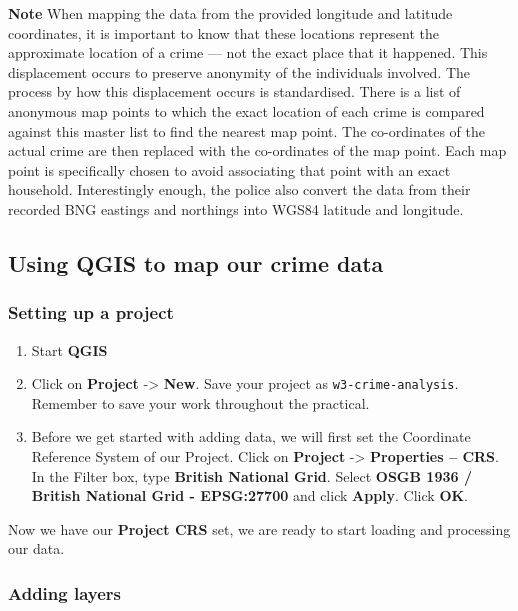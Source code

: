 \documentclass[
]{book}
\begin{document}
\textbf{Note}
When mapping the data from the provided longitude and latitude coordinates, it is important to know that these locations represent the approximate location of a crime --- not the exact place that it happened. This displacement occurs to preserve anonymity of the individuals involved. The process by how this displacement occurs is standardised. There is a list of anonymous map points to which the exact location of each crime is compared against this master list to find the nearest map point. The co-ordinates of the actual crime are then replaced with the co-ordinates of the map point. Each map point is specifically chosen to avoid associating that point with an exact household. Interestingly enough, the police also convert the data from their recorded BNG eastings and northings into WGS84 latitude and longitude.

\hypertarget{using-qgis-to-map-our-crime-data}{%
\subsection{Using QGIS to map our crime data}\label{using-qgis-to-map-our-crime-data}}

\hypertarget{setting-up-a-project-1}{%
\subsubsection{Setting up a project}\label{setting-up-a-project-1}}

\begin{enumerate}
\def\labelenumi{\arabic{enumi}.}
\item
  Start \textbf{QGIS}
\item
  Click on \textbf{Project} -\textgreater{} \textbf{New}. Save your project as \texttt{w3-crime-analysis}. Remember to save your work throughout the practical.
\item
  Before we get started with adding data, we will first set the Coordinate Reference System of our Project. Click on \textbf{Project} -\textgreater{} \textbf{Properties -- CRS}. In the Filter box, type \textbf{British National Grid}. Select \textbf{OSGB 1936 / British National Grid - EPSG:27700} and click \textbf{Apply}. Click \textbf{OK}.
\end{enumerate}

Now we have our \textbf{Project CRS} set, we are ready to start loading and processing our data.

\hypertarget{adding-layers-1}{%
\subsubsection{Adding layers}\label{adding-layers-1}}
\end{document}
